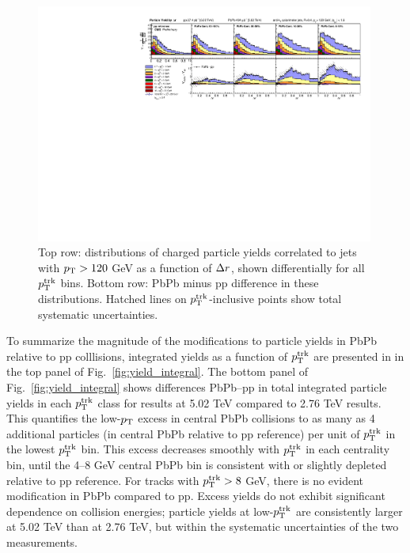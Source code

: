   \begin{figure}[hbt]
    \begin{center}
       \includegraphics[width=0.99\textwidth]{figures/results/ParticleYield_by_dR.pdf}
         \caption[Inclusive jet distribution of charged particles as a function of $\Delta r$ at 5.02 TeV]{Top row:  distributions of charged particle yields correlated to jets with $p_{\rm T} > 120$ GeV as a function of $\protect\Delta r$, shown differentially for all $p_{\rm T}^{\rm trk}$ bins. Bottom row:  PbPb minus pp difference in these distributions. Hatched lines on $p_{\rm T}^{\rm trk}$-inclusive points show total systematic uncertainties.}
       \label{fig:yield_dr_stacked}
    \end{center}
 \end{figure}
 
 \clearpage
 
To summarize the magnitude of the modifications to particle yields in PbPb relative to pp colllisions, integrated yields as a function of $p_{\rm T}^{\rm trk}$ are presented in in the top panel of Fig.~\ref{fig:yield_integral}.  The bottom panel of Fig.~\ref{fig:yield_integral} shows differences PbPb--pp in total integrated particle yields in each $p_{\rm T}^{\rm trk}$ class for results at 5.02 TeV compared to 2.76 TeV results.  This quantifies the low-$p_{\rm T}$ excess in central PbPb collisions to as many as 4 additional particles (in central PbPb relative to pp reference) per unit of $p_{\rm T}^{\rm trk}$ in the lowest $p_{\rm T}^{\rm trk}$ bin.  This excess decreases smoothly with $p_{\rm T}^{\rm trk}$ in each centrality bin, until the 4--8 GeV central PbPb bin is consistent with or slightly depleted relative to pp reference.  For tracks with  $p_{\rm T}^{\rm trk} > 8 $ GeV, there is no evident modification in PbPb compared to pp.  Excess yields do not exhibit significant dependence on collision energies; particle yields at low-$p_{\rm T}^{\rm trk}$ are consistently larger at 5.02 TeV than at 2.76 TeV, but within the systematic uncertainties of the two measurements. 

